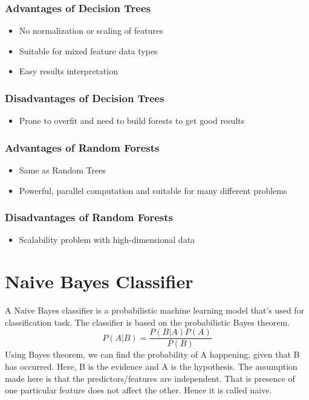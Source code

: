 \documentclass{article}
\begin{document}
\subsubsection{Advantages of Decision Trees}
\begin{itemize}
	\item No normalization or scaling of features
	\item Suitable for mixed feature data types
	\item Easy results interpretation
\end{itemize}
\subsubsection{Disadvantages of Decision Trees}
\begin{itemize}
\item Prone to overfit and need to build forests to get good results
\end{itemize}

\subsubsection{Advantages of Random Forests}
\begin{itemize}
	\item Same as Random Trees
	\item Powerful, parallel computation and suitable for many different problems
\end{itemize}
\subsubsection{Disadvantages of Random Forests}
\begin{itemize}
	\item Scalability problem with high-dimensional data
\end{itemize}

\section{Naive Bayes Classifier}
A Naive Bayes classifier is a probabilistic machine learning model that’s used for classification task. The classifier is based on the probabilistic Bayes theorem.
\begin{equation}
\label{eq:bayes-theorem}
P(A|B) = \frac{P(B|A) P(A)}{P(B)}
\end{equation}
Using Bayes theorem, we can find the probability of A happening, given that B has occurred. Here, B is the evidence and A is the hypothesis. The assumption made here is that the predictors/features are independent. That is presence of one particular feature does not affect the other. Hence it is called naive.
\end{document}
